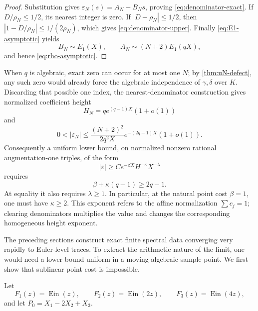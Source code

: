 \documentclass[11pt]{article}
\theoremstyle{definition}
\theoremstyle{remark}
\newcommand{\Ein}{\operatorname{Ein}}
\begin{document}
\begin{proof}
Substitution gives \(\varepsilon_N(s)=A_N+B_Ns\), proving
\eqref{eq:denominator-exact}.  If \(D/\rho_N\le1/2\), its nearest integer
is zero.  If \(|D-\rho_N|\le1/2\), then
\(|1-D/\rho_N|\le1/(2\rho_N)\), which gives
\eqref{eq:denominator-upper}.  Finally \eqref{eq:E1-asymptotic} yields
\[
 B_N\sim E_1(X),
 \qquad
 A_N\sim(N+2)E_1(qX),
\]
and hence \eqref{eq:rho-asymptotic}.
\end{proof}

When \(q\) is algebraic, exact zero can occur for at most one \(N\); by
\cref{thm:uN-defect}, any such zero would already force the algebraic
independence of \(\gamma,\delta\) over \(K\).  Discarding that possible one
index, the nearest-denominator construction gives normalized coefficient
height
\[
 H_N=q e^{(q-1)X}(1+o(1))
\]
and
\begin{equation}\label{eq:critical-height-upper}
 0<|\varepsilon_N|
 \le\frac{(N+2)^2}{2q^2X}
 e^{-(2q-1)X}(1+o(1)).
\end{equation}
Consequently a uniform lower bound, on normalized nonzero rational
augmentation-one triples, of the form
\[
 |\varepsilon|\ge C e^{-\beta X}H^{-\kappa}X^{-\lambda}
\]
requires
\begin{equation}\label{eq:height-frontier}
 \boxed{\beta+\kappa(q-1)\ge2q-1.}
\end{equation}
At equality it also requires \(\lambda\ge1\).  In particular, at the natural
point cost \(\beta=1\), one must have \(\kappa\ge2\).  This exponent refers
to the affine normalization \(\sum c_j=1\); clearing denominators multiplies
the value and changes the corresponding homogeneous height exponent.

The preceding sections construct exact finite spectral data converging very
rapidly to Euler-level traces.  To extract the arithmetic nature of the
limit, one would need a lower bound uniform in a moving algebraic sample
point.  We first show that sublinear point cost is impossible.

Let
\[
 F_1(z)=\Ein(z),\qquad
 F_2(z)=\Ein(2z),\qquad
 F_3(z)=\Ein(4z),
\]
and let \(P_0=X_1-2X_2+X_3\).
\end{document}
